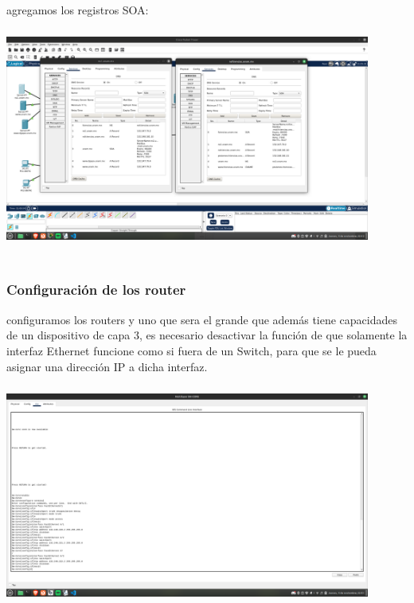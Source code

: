 \documentclass[14pt]{book}
\begin{document}
agregamos los registros SOA:\\

\includegraphics[width=12cm, height=8cm]{images/soa.png}\\

{\color{red} \subsubsection*{\textbf{Configuración de los router}}}
\vspace{1em}

configuramos los routers y uno que sera el grande que además
tiene capacidades de un dispositivo de capa 3, es necesario desactivar la función de que
solamente la interfaz Ethernet funcione como si fuera de un Switch, para que se le
pueda asignar una dirección IP a dicha interfaz.\\

\includegraphics[width=12cm, height=8cm]{images/router grandote.png}\\
\end{document}
